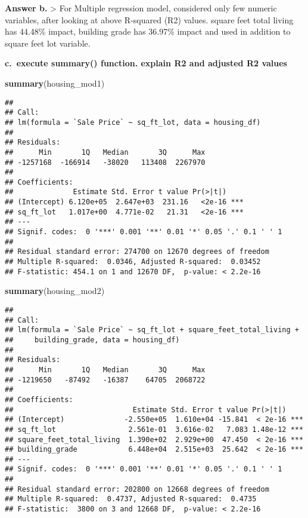 \documentclass[
]{article}
\newenvironment{Shaded}{\begin{snugshade}}{\end{snugshade}}
\newcommand{\KeywordTok}[1]{\textcolor[rgb]{0.13,0.29,0.53}{\textbf{#1}}}
\newcommand{\NormalTok}[1]{#1}
\begin{document}
\textbf{Answer b. } \textgreater{} For Multiple regression model,
considered only few numeric variables, after looking at above R-squared
(R2) values. square feet total living has 44.48\% impact, building grade
has 36.97\% impact and used in addition to square feet lot variable.

\textbf{c.~execute summary() function. explain R2 and adjusted R2
values}

\begin{Shaded}
\begin{Highlighting}[]
\KeywordTok{summary}\NormalTok{(housing_mod1)}
\end{Highlighting}
\end{Shaded}

\begin{verbatim}
## 
## Call:
## lm(formula = `Sale Price` ~ sq_ft_lot, data = housing_df)
## 
## Residuals:
##      Min       1Q   Median       3Q      Max 
## -1257168  -166914   -38020   113408  2267970 
## 
## Coefficients:
##              Estimate Std. Error t value Pr(>|t|)    
## (Intercept) 6.120e+05  2.647e+03  231.16   <2e-16 ***
## sq_ft_lot   1.017e+00  4.771e-02   21.31   <2e-16 ***
## ---
## Signif. codes:  0 '***' 0.001 '**' 0.01 '*' 0.05 '.' 0.1 ' ' 1
## 
## Residual standard error: 274700 on 12670 degrees of freedom
## Multiple R-squared:  0.0346, Adjusted R-squared:  0.03452 
## F-statistic: 454.1 on 1 and 12670 DF,  p-value: < 2.2e-16
\end{verbatim}

\begin{Shaded}
\begin{Highlighting}[]
\KeywordTok{summary}\NormalTok{(housing_mod2)}
\end{Highlighting}
\end{Shaded}

\begin{verbatim}
## 
## Call:
## lm(formula = `Sale Price` ~ sq_ft_lot + square_feet_total_living + 
##     building_grade, data = housing_df)
## 
## Residuals:
##      Min       1Q   Median       3Q      Max 
## -1219650   -87492   -16387    64705  2068722 
## 
## Coefficients:
##                            Estimate Std. Error t value Pr(>|t|)    
## (Intercept)              -2.550e+05  1.610e+04 -15.841  < 2e-16 ***
## sq_ft_lot                 2.561e-01  3.616e-02   7.083 1.48e-12 ***
## square_feet_total_living  1.390e+02  2.929e+00  47.450  < 2e-16 ***
## building_grade            6.448e+04  2.515e+03  25.642  < 2e-16 ***
## ---
## Signif. codes:  0 '***' 0.001 '**' 0.01 '*' 0.05 '.' 0.1 ' ' 1
## 
## Residual standard error: 202800 on 12668 degrees of freedom
## Multiple R-squared:  0.4737, Adjusted R-squared:  0.4735 
## F-statistic:  3800 on 3 and 12668 DF,  p-value: < 2.2e-16
\end{verbatim}
\end{document}
